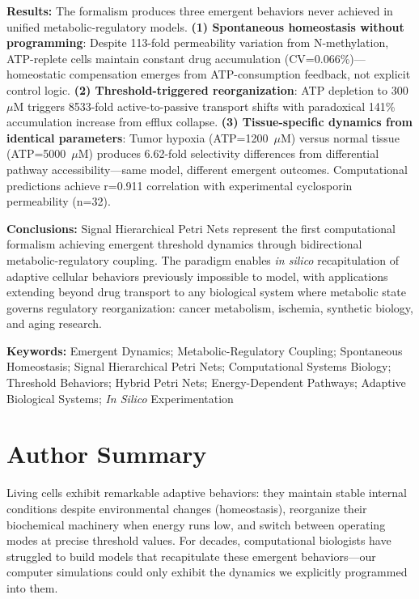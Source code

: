 \documentclass[10pt,letterpaper]{article}
\begin{document}
\textbf{Results:} The formalism produces three emergent behaviors never achieved in unified metabolic-regulatory models. \textbf{(1) Spontaneous homeostasis without programming}: Despite 113-fold permeability variation from N-methylation, ATP-replete cells maintain constant drug accumulation (CV=0.066\%)—homeostatic compensation emerges from ATP-consumption feedback, not explicit control logic. \textbf{(2) Threshold-triggered reorganization}: ATP depletion to 300~$\mu$M triggers 8533-fold active-to-passive transport shifts with paradoxical 141\% accumulation increase from efflux collapse. \textbf{(3) Tissue-specific dynamics from identical parameters}: Tumor hypoxia (ATP=1200~$\mu$M) versus normal tissue (ATP=5000~$\mu$M) produces 6.62-fold selectivity differences from differential pathway accessibility—same model, different emergent outcomes. Computational predictions achieve r=0.911 correlation with experimental cyclosporin permeability (n=32).

\textbf{Conclusions:} Signal Hierarchical Petri Nets represent the first computational formalism achieving emergent threshold dynamics through bidirectional metabolic-regulatory coupling. The paradigm enables \textit{in silico} recapitulation of adaptive cellular behaviors previously impossible to model, with applications extending beyond drug transport to any biological system where metabolic state governs regulatory reorganization: cancer metabolism, ischemia, synthetic biology, and aging research.

\vspace{6pt}
\noindent\textbf{Keywords:} Emergent Dynamics; Metabolic-Regulatory Coupling; Spontaneous Homeostasis; Signal Hierarchical Petri Nets; Computational Systems Biology; Threshold Behaviors; Hybrid Petri Nets; Energy-Dependent Pathways; Adaptive Biological Systems; \textit{In Silico} Experimentation

\section*{Author Summary}
Living cells exhibit remarkable adaptive behaviors: they maintain stable internal conditions despite environmental changes (homeostasis), reorganize their biochemical machinery when energy runs low, and switch between operating modes at precise threshold values. For decades, computational biologists have struggled to build models that recapitulate these emergent behaviors—our computer simulations could only exhibit the dynamics we explicitly programmed into them.
\end{document}
